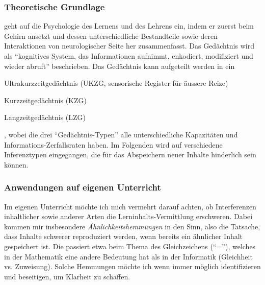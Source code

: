 \begin{myExBox}[title=Interferenzen vermeiden]
\subsubsection*{Theoretische Grundlage}
\textcite{alma99116996690305511} geht auf die Psychologie des Lernens und des Lehrens ein, indem er zuerst beim Gehirn ansetzt und dessen unterschiedliche Bestandteile sowie deren Interaktionen von neurologischer Seite her zusammenfasst. Das Gedächtnis wird als ``kognitives System, das Informationen aufnimmt, enkodiert, modifiziert und wieder abruft'' beschrieben. Das Gedächtnis kann aufgeteilt werden in ein \begin{enumerate*}
\item Ultrakurzzeitgedächtnis (UKZG, sensorische Register für äussere Reize)
\item Kurzzeitgedächtnis (KZG)
\item Langzeitgedächtnis (LZG)
\end{enumerate*}, wobei die drei ``Gedächtnis-Typen'' alle unterschiedliche Kapazitäten und Informations-Zerfallsraten haben. Im Folgenden wird auf verschiedene Inferenztypen eingegangen, die für das Abspeichern neuer Inhalte hinderlich sein können.
\subsubsection*{Anwendungen auf eigenen Unterricht}
Im eigenen Unterricht möchte ich mich vermehrt darauf achten, ob Interferenzen inhaltlicher sowie anderer Arten die Lerninhalts-Vermittlung erschweren. Dabei kommen mir insbesondere \textit{Ähnlichkeitshemmungen} in den Sinn, also die Tatsache, dass Inhalte schwerer reproduziert werden, wenn bereits ein ähnlicher Inhalt gespeichert ist. Die passiert etwa beim Thema des Gleichzeichens (``=''), welches in der Mathematik eine andere Bedeutung hat als in der Informatik (Gleichheit vs. Zuweisung). Solche Hemmungen möchte ich wenn immer möglich identifizieren und beseitigen, um Klarheit zu schaffen.
\end{myExBox}



